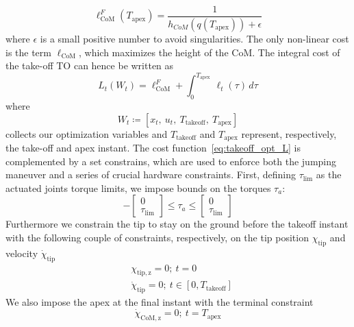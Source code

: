 \begin{equation}\label{eq:max_com}
\ell_{\mathrm{CoM}}^F(T_{\mathrm{apex}}) = \dfrac{1}{h_{CoM}(q(T_{\mathrm{apex}})) + \epsilon}
\end{equation}
where $\epsilon$ is a small positive number to avoid singularities.
The only non-linear cost is the term $\ell_{\mathrm{CoM}}$, which maximizes the height of the CoM. The integral cost of the take-off TO can hence be written as
\begin{dmath}\label{eq:takeoff_opt_L}
    L_{t} \left( W_t\right) = \ell_{\mathrm{CoM}}^F + \int_{0}^{T_{\mathrm{apex}}}\,\ell_{t}(\tau)\,d\tau
\end{dmath}
where
\begin{equation}\label{takeoff_opt:opt_vars}
W_t \coloneqq \left[x_t,~u_t,~T_{\mathrm{takeoff}},~T_{\mathrm{apex}}\right]
\end{equation} 
collects our optimization variables and $T_{\mathrm{takeoff}}$ and $T_{\mathrm{apex}}$ represent, respectively, the take-off and apex instant. 
The cost function~\eqref{eq:takeoff_opt_L} is complemented by a set constrains, which are used to  enforce both the jumping maneuver and a series of crucial hardware constraints. First, defining $\tau_{\mathrm{lim}}$ as the actuated joints torque limits, we impose bounds on the torques $\tau_a$:
\begin{equation}\label{eq:tau_lims}
- \begin{bmatrix}
0\\
\tau_{\mathrm{lim}}
\end{bmatrix} \leq \tau_a \leq \begin{bmatrix}
0\\
\tau_{\mathrm{lim}}
\end{bmatrix}
\end{equation}
Furthermore we constrain the tip to stay on the ground before the takeoff instant with the following couple of constraints, respectively, on the tip position $\chi_{\mathrm{tip}}$ and velocity $\dot{\chi}_{\mathrm{tip}}$
\begin{eqnarray}
&\chi_{\mathrm{tip, z}} = 0 \label{eq:tip_on_ground}\label{eq:tip_on_ground_vel};~t = 0\\
&\dot{\chi}_{\mathrm{tip}} = 0;~t\in\left[0, T_{\mathrm{takeoff}}\right]
\end{eqnarray}
We also impose the apex at the final instant with the terminal constraint
\begin{equation}\label{eq:apex_com}
\dot{\chi}_{\mathrm{CoM, z}} = 0;~t = T_{\mathrm{apex}}
\end{equation}
